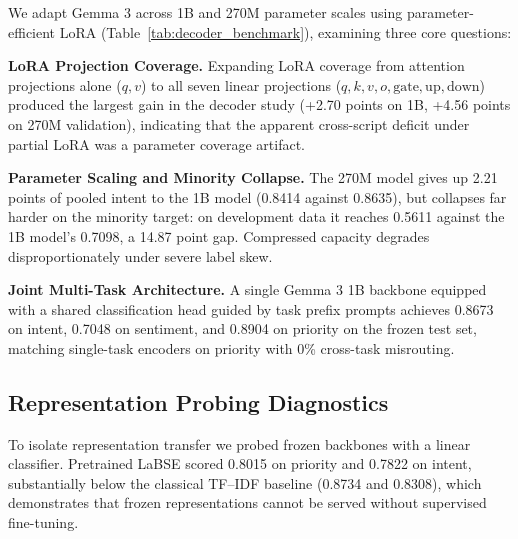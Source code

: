 We adapt Gemma 3 across 1B and 270M parameter scales using parameter-efficient LoRA  (Table~\ref{tab:decoder_benchmark}), examining three core questions:

\textbf{LoRA Projection Coverage.} Expanding LoRA coverage from attention projections alone ($q, v$) to all seven linear projections ($q, k, v, o, \mathrm{gate}, \mathrm{up}, \mathrm{down}$) produced the largest gain in the decoder study (+2.70 points on 1B, +4.56 points on 270M validation), indicating that the apparent cross-script deficit under partial LoRA was a parameter coverage artifact.

\textbf{Parameter Scaling and Minority Collapse.} The 270M model gives up 2.21 points of pooled intent \macrof{} to the 1B model (0.8414 against 0.8635), but collapses far harder on the minority target: on development data it reaches 0.5611 \negf{} against the 1B model's 0.7098, a 14.87 point gap. Compressed capacity degrades disproportionately under severe label skew.

\textbf{Joint Multi-Task Architecture.} A single Gemma 3 1B backbone equipped with a shared classification head guided by task prefix prompts achieves 0.8673 on intent, 0.7048 on sentiment, and 0.8904 on priority on the frozen test set, matching single-task encoders on priority with 0\% cross-task misrouting.

\subsection{Representation Probing Diagnostics}

To isolate representation transfer we probed frozen backbones with a linear
classifier. Pretrained LaBSE scored 0.8015 on priority and 0.7822 on intent,
substantially below the classical TF--IDF baseline (0.8734 and 0.8308), which
demonstrates that frozen representations cannot be served without supervised
fine-tuning.
